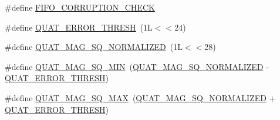 \begin{DoxyCompactItemize}
\#define \hyperlink{group___d_r_i_v_e_r_s_gabb3bcb4d19c847aa89a356478b7da027}{F\+I\+F\+O\+\_\+\+C\+O\+R\+R\+U\+P\+T\+I\+O\+N\+\_\+\+C\+H\+E\+CK}
\item 
\#define \hyperlink{group___d_r_i_v_e_r_s_ga633dcbd524d41e6f76c0fda39828c8e1}{Q\+U\+A\+T\+\_\+\+E\+R\+R\+O\+R\+\_\+\+T\+H\+R\+E\+SH}~(1\+L$<$$<$24)
\item 
\#define \hyperlink{group___d_r_i_v_e_r_s_ga290880f86641e11d62db9792eab808bd}{Q\+U\+A\+T\+\_\+\+M\+A\+G\+\_\+\+S\+Q\+\_\+\+N\+O\+R\+M\+A\+L\+I\+Z\+ED}~(1\+L$<$$<$28)
\item 
\#define \hyperlink{group___d_r_i_v_e_r_s_gae76871da254b93d8b944ec65792db252}{Q\+U\+A\+T\+\_\+\+M\+A\+G\+\_\+\+S\+Q\+\_\+\+M\+IN}~(\hyperlink{group___d_r_i_v_e_r_s_ga290880f86641e11d62db9792eab808bd}{Q\+U\+A\+T\+\_\+\+M\+A\+G\+\_\+\+S\+Q\+\_\+\+N\+O\+R\+M\+A\+L\+I\+Z\+ED} -\/ \hyperlink{group___d_r_i_v_e_r_s_ga633dcbd524d41e6f76c0fda39828c8e1}{Q\+U\+A\+T\+\_\+\+E\+R\+R\+O\+R\+\_\+\+T\+H\+R\+E\+SH})
\item 
\#define \hyperlink{group___d_r_i_v_e_r_s_ga3036f612f259f4e13c631a31fb0e7176}{Q\+U\+A\+T\+\_\+\+M\+A\+G\+\_\+\+S\+Q\+\_\+\+M\+AX}~(\hyperlink{group___d_r_i_v_e_r_s_ga290880f86641e11d62db9792eab808bd}{Q\+U\+A\+T\+\_\+\+M\+A\+G\+\_\+\+S\+Q\+\_\+\+N\+O\+R\+M\+A\+L\+I\+Z\+ED} + \hyperlink{group___d_r_i_v_e_r_s_ga633dcbd524d41e6f76c0fda39828c8e1}{Q\+U\+A\+T\+\_\+\+E\+R\+R\+O\+R\+\_\+\+T\+H\+R\+E\+SH})
\end{DoxyCompactItemize}
